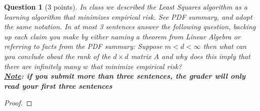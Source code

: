 \documentclass[12pt]{article}
\newtheorem{question}{Question}
\begin{document}
\begin{question}[3 points]
  In class we described the Least Squares algorithm as a learning algorithm that minimizes empirical risk.  See PDF summary, and adopt the same notation. In at most 3 sentences answer the following question, backing up each claim you make by either naming a theorem from Linear Algebra  or  referring  to  facts  from  the  PDF  summary:  Suppose $m < d < \infty$ then  what  can  you conclude about the rank of the $d \times d$ matrix $A$ and why does this imply that there are infinitely many $w$ that minimize empirical risk? \\
  \textbf{\underline{Note}: if you submit more than three sentences, the grader will only read your \textbf{first three sentences}}
\end{question}
\begin{proof}


\end{proof}
\end{document}
